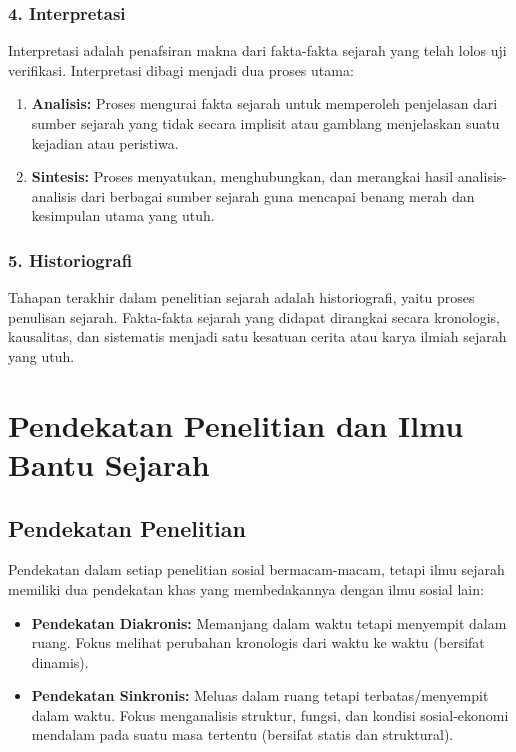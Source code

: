 \documentclass[12pt, a4paper]{article}
\begin{document}
\subsubsection{4. Interpretasi}
Interpretasi adalah penafsiran makna dari fakta-fakta sejarah yang telah lolos uji verifikasi. Interpretasi dibagi menjadi dua proses utama:
\begin{enumerate}
	\item \textbf{Analisis:} Proses mengurai fakta sejarah untuk memperoleh penjelasan dari sumber sejarah yang tidak secara implisit atau gamblang menjelaskan suatu kejadian atau peristiwa.
	\item \textbf{Sintesis:} Proses menyatukan, menghubungkan, dan merangkai hasil analisis-analisis dari berbagai sumber sejarah guna mencapai benang merah dan kesimpulan utama yang utuh.
\end{enumerate}

\subsubsection{5. Historiografi}
Tahapan terakhir dalam penelitian sejarah adalah historiografi, yaitu proses penulisan sejarah. Fakta-fakta sejarah yang didapat dirangkai secara kronologis, kausalitas, dan sistematis menjadi satu kesatuan cerita atau karya ilmiah sejarah yang utuh.

\section{Pendekatan Penelitian dan Ilmu Bantu Sejarah}
\subsection{Pendekatan Penelitian}
Pendekatan dalam setiap penelitian sosial bermacam-macam, tetapi ilmu sejarah memiliki dua pendekatan khas yang membedakannya dengan ilmu sosial lain:
\begin{itemize}
	\item \textbf{Pendekatan Diakronis:} Memanjang dalam waktu tetapi menyempit dalam ruang. Fokus melihat perubahan kronologis dari waktu ke waktu (bersifat dinamis).
	\item \textbf{Pendekatan Sinkronis:} Meluas dalam ruang tetapi terbatas/menyempit dalam waktu. Fokus menganalisis struktur, fungsi, dan kondisi sosial-ekonomi mendalam pada suatu masa tertentu (bersifat statis dan struktural).
\end{itemize}
\end{document}
